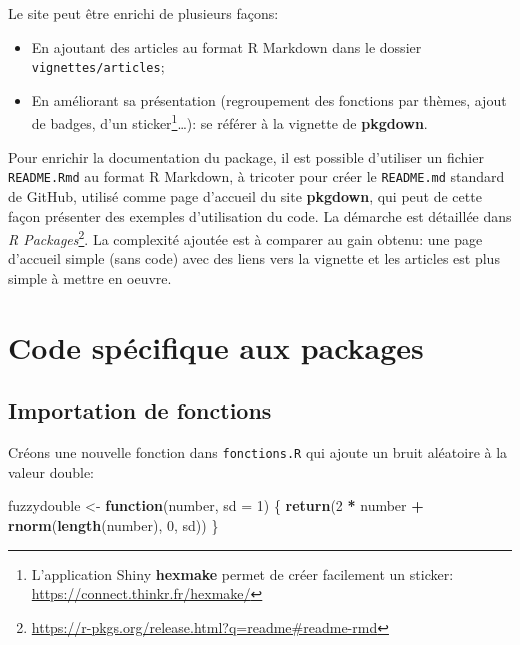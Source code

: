 \documentclass[
  12pt,
  french,
  a4paper,
  extrafontsizes,onecolumn,openright
  ]{memoir}
\newenvironment{Shaded}{\begin{snugshade}}{\end{snugshade}}
\newcommand{\ControlFlowTok}[1]{\textcolor[rgb]{0.13,0.29,0.53}{\textbf{#1}}}
\newcommand{\DataTypeTok}[1]{\textcolor[rgb]{0.13,0.29,0.53}{#1}}
\newcommand{\DecValTok}[1]{\textcolor[rgb]{0.00,0.00,0.81}{#1}}
\newcommand{\KeywordTok}[1]{\textcolor[rgb]{0.13,0.29,0.53}{\textbf{#1}}}
\newcommand{\NormalTok}[1]{#1}
\newcommand{\OperatorTok}[1]{\textcolor[rgb]{0.81,0.36,0.00}{\textbf{#1}}}
\newcommand{\StringTok}[1]{\textcolor[rgb]{0.31,0.60,0.02}{#1}}
\providecommand{\tightlist}{%
  \setlength{\itemsep}{0pt}\setlength{\parskip}{0pt}}
\begin{document}
Le site peut être enrichi de plusieurs façons:

\begin{itemize}
\tightlist
\item
  En ajoutant des articles au format R Markdown dans le dossier \texttt{vignettes/articles};
\item
  En améliorant sa présentation (regroupement des fonctions par thèmes, ajout de badges, d'un sticker\footnote{L'application Shiny \textbf{hexmake} permet de créer facilement un sticker: \url{https://connect.thinkr.fr/hexmake/}}\ldots): se référer à la vignette de \textbf{pkgdown}.
\end{itemize}

Pour enrichir la documentation du package, il est possible d'utiliser un fichier \texttt{README.Rmd} au format R Markdown, à tricoter pour créer le \texttt{README.md} standard de GitHub, utilisé comme page d'accueil du site \textbf{pkgdown}, qui peut de cette façon présenter des exemples d'utilisation du code.
La démarche est détaillée dans \emph{R Packages}\footnote{\url{https://r-pkgs.org/release.html?q=readme\#readme-rmd}}.
La complexité ajoutée est à comparer au gain obtenu: une page d'accueil simple (sans code) avec des liens vers la vignette et les articles est plus simple à mettre en oeuvre.

\hypertarget{code-spuxe9cifique-aux-packages}{%
\section{Code spécifique aux packages}\label{code-spuxe9cifique-aux-packages}}

\hypertarget{importation-de-fonctions}{%
\subsection{Importation de fonctions}\label{importation-de-fonctions}}

Créons une nouvelle fonction dans \texttt{fonctions.R} qui ajoute un bruit aléatoire à la valeur double:

\scriptsize

\begin{Shaded}
\begin{Highlighting}[]
\NormalTok{fuzzydouble <-}\StringTok{ }\ControlFlowTok{function}\NormalTok{(number, }\DataTypeTok{sd =} \DecValTok{1}\NormalTok{) \{}
    \KeywordTok{return}\NormalTok{(}\DecValTok{2} \OperatorTok{*}\StringTok{ }\NormalTok{number }\OperatorTok{+}\StringTok{ }\KeywordTok{rnorm}\NormalTok{(}\KeywordTok{length}\NormalTok{(number), }\DecValTok{0}\NormalTok{, sd))}
\NormalTok{\}}
\end{Highlighting}
\end{Shaded}
\end{document}
